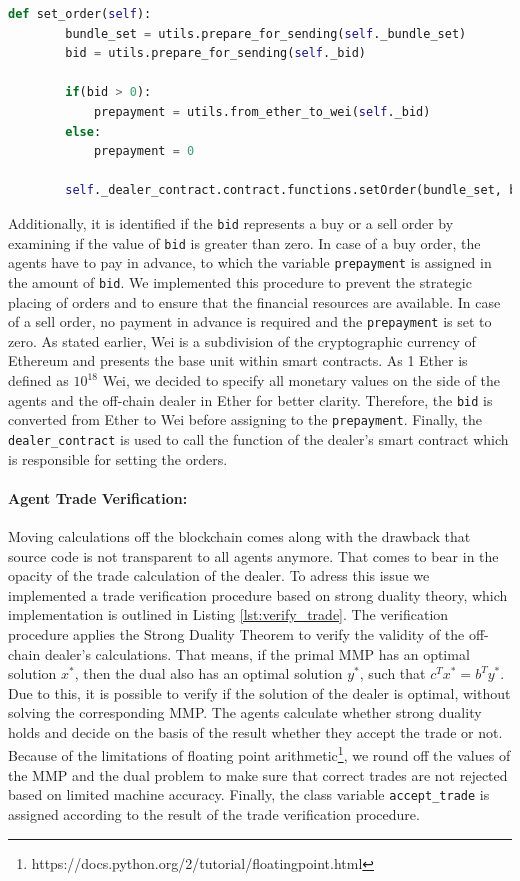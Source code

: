 \begin{lstlisting}[float=htbp, label=lst:set_order, caption=Submitting of Order to Smart Contract Dealer, language=Python]
    def set_order(self):
        bundle_set = utils.prepare_for_sending(self._bundle_set)
        bid = utils.prepare_for_sending(self._bid)
        
        if(bid > 0):
            prepayment = utils.from_ether_to_wei(self._bid)
        else:
            prepayment = 0

        self._dealer_contract.contract.functions.setOrder(bundle_set, bid, prepayment).transact({'from': self._account_address, 'value': prepayment})
\end{lstlisting}

Additionally, it is identified if the \verb|bid| represents a buy or a sell order by examining if the value 
of \verb|bid| is greater than zero. In case of a buy order, the agents have to pay in advance, to which 
the variable \verb|prepayment| is assigned in the amount of \verb|bid|.
We implemented this procedure to prevent the strategic placing of orders and to ensure 
that the financial resources are available.
In case of a sell order, no payment in advance is required and the \verb|prepayment| is set to zero.
As stated earlier, Wei is a subdivision of the cryptographic currency of Ethereum and presents the base unit within smart contracts.
As 1 Ether is defined as $10^{18}$ Wei, we decided to specify all monetary values on the side 
of the agents and the off-chain dealer in Ether for better clarity.
Therefore, the \verb|bid| is converted from Ether to Wei before assigning to the \verb|prepayment|.
Finally, the \verb|dealer_contract| is used to call the function of the dealer's smart contract which is
responsible for setting the orders.

\paragraph{Agent Trade Verification:} Moving calculations off the blockchain comes along with the drawback that source code is not
transparent to all agents anymore. 
That comes to bear in the opacity of the trade calculation of the dealer. 
To adress this issue we implemented a trade verification procedure based on 
strong duality theory, which implementation is outlined in Listing \ref{lst:verify_trade}.
The verification procedure applies the Strong Duality Theorem to verify the validity of the off-chain dealer's calculations.
That means, if the primal MMP has an optimal solution $x^{*}$, then 
the dual also has an optimal solution $y^{*}$, such that $c^{T}x^{*} = b^{T}y^{*}$.
Due to this, it is possible to verify if the solution of the dealer is optimal, without solving the corresponding MMP. 
The agents calculate whether strong duality holds and decide on the basis of the result whether they accept the trade or not.
Because of the limitations of floating point arithmetic\footnote{https://docs.python.org/2/tutorial/floatingpoint.html}, 
we round off the values of the MMP and the dual problem to make sure that correct trades 
are not rejected based on limited machine accuracy.
Finally, the class variable \verb|accept_trade| is assigned according to the result of the trade verification 
procedure.

